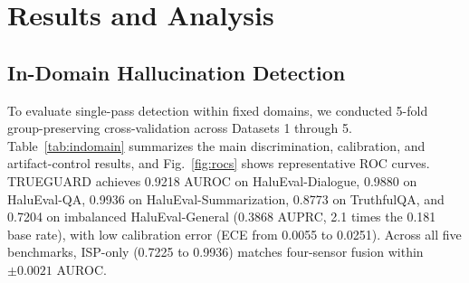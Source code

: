 \documentclass{ieeeaccess}
\begin{document}
\section{Results and Analysis}
\label{sec:results}

\subsection{In-Domain Hallucination Detection}
To evaluate single-pass detection within fixed domains, we conducted 5-fold group-preserving cross-validation across Datasets 1 through 5. Table~\ref{tab:indomain} summarizes the main discrimination, calibration, and artifact-control results, and Fig.~\ref{fig:rocs} shows representative ROC curves. TRUEGUARD achieves 0.9218 AUROC on HaluEval-Dialogue, 0.9880 on HaluEval-QA, 0.9936 on HaluEval-Summarization, 0.8773 on TruthfulQA, and 0.7204 on imbalanced HaluEval-General (0.3868 AUPRC, 2.1 times the 0.181 base rate), with low calibration error (ECE from 0.0055 to 0.0251). Across all five benchmarks, ISP-only (0.7225 to 0.9936) matches four-sensor fusion within $\pm 0.0021$ AUROC.

\begin{table}[t]
\centering
\caption{In-Domain 5-Fold Group-Preserving Cross-Validation With Dataset-Artifact Controls}
\label{tab:indomain}
\end{table}
\end{document}

